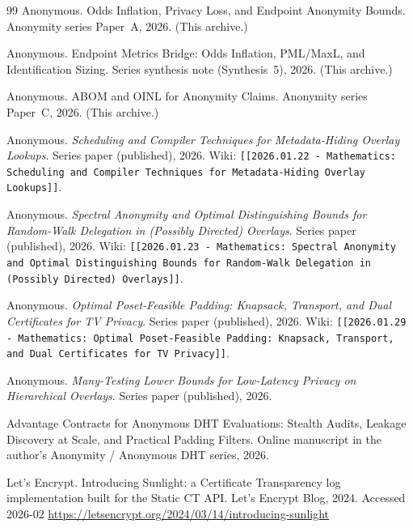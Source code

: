 \documentclass[11pt]{article}
\begin{document}
\begin{thebibliography}{99}
Anonymous.
\newblock Odds Inflation, Privacy Loss, and Endpoint Anonymity Bounds.
\newblock Anonymity series Paper~A, 2026. (This archive.)

Anonymous.
\newblock Endpoint Metrics Bridge: Odds Inflation, PML/MaxL, and Identification Sizing.
\newblock Series synthesis note (Synthesis~5), 2026. (This archive.)

Anonymous.
\newblock ABOM and OINL for Anonymity Claims.
\newblock Anonymity series Paper~C, 2026. (This archive.)

Anonymous.
\newblock \emph{Scheduling and Compiler Techniques for Metadata-Hiding Overlay Lookups}.
\newblock Series paper (published), 2026.
\newblock Wiki: \texttt{[[2026.01.22 - Mathematics: Scheduling and Compiler Techniques for Metadata-Hiding Overlay Lookups]]}.

Anonymous.
\newblock \emph{Spectral Anonymity and Optimal Distinguishing Bounds for Random-Walk Delegation in (Possibly Directed) Overlays}.
\newblock Series paper (published), 2026.
\newblock Wiki: \texttt{[[2026.01.23 - Mathematics: Spectral Anonymity and Optimal Distinguishing Bounds for Random-Walk Delegation in (Possibly Directed) Overlays]]}.

Anonymous.
\newblock \emph{Optimal Poset-Feasible Padding: Knapsack, Transport, and Dual Certificates for TV Privacy}.
\newblock Series paper (published), 2026.
\newblock Wiki: \texttt{[[2026.01.29 - Mathematics: Optimal Poset-Feasible Padding: Knapsack, Transport, and Dual Certificates for TV Privacy]]}.

Anonymous.
\newblock \emph{Many-Testing Lower Bounds for Low-Latency Privacy on Hierarchical Overlays}.
\newblock Series paper (published), 2026.

\newblock Advantage Contracts for Anonymous DHT Evaluations: Stealth Audits, Leakage Discovery at Scale, and Practical Padding Filters.
\newblock Online manuscript in the author's Anonymity / Anonymous DHT series, 2026.

{Let's Encrypt}.
\newblock Introducing Sunlight: a Certificate Transparency log implementation built for the Static CT API.
\newblock Let's Encrypt Blog, 2024.
\newblock Accessed 2026-02
\newblock \url{https://letsencrypt.org/2024/03/14/introducing-sunlight}


\end{thebibliography}
\end{document}
